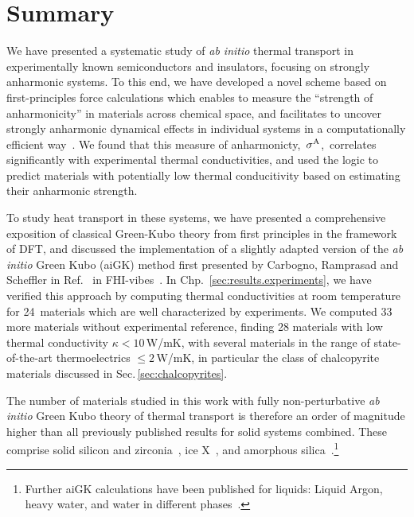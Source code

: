 \section*{Summary}

We have presented a systematic study of \emph{ab initio} thermal transport in experimentally known semiconductors and insulators, focusing on strongly anharmonic systems. To this end, we have developed a novel scheme based on first-principles force calculations which enables to measure the ``strength of anharmonicity'' in materials across chemical space, and facilitates to uncover strongly anharmonic dynamical effects in individual systems in a computationally efficient way~\cite{Knoop.2020}.
 We found that this measure of anharmonicty,~$\sigma^\mathrm{A}$,~correlates significantly with experimental thermal conductivities, and used the logic to predict materials with potentially low thermal conducitivity based on estimating their anharmonic strength.

To study heat transport in these systems, we have presented a comprehensive exposition of classical Green-Kubo theory from first principles in the framework of DFT, and discussed the implementation of a slightly adapted version of the \emph{ab initio} Green Kubo (aiGK) method first presented by Carbogno, Ramprasad and Scheffler in Ref.~\cite{Carbogno.2016} in FHI-vibes~\cite{FHI-vibes}. In Chp.~\ref{sec:results.experiments}, we have verified this approach by computing thermal conductivities at room temperature for 24~materials which are well characterized by experiments. 
We computed 33 more materials without experimental reference, finding 28 materials with low thermal conductivity $\kappa < 10$\,W/mK, with several materials in the range of state-of-the-art thermoelectrics $\leq 2$\,W/mK, in particular the class of chalcopyrite materials discussed in Sec.\,\ref{sec:chalcopyrites}.

The number of materials studied in this work with fully non-perturbative \emph{ab initio} Green Kubo theory of thermal transport is therefore an order of magnitude higher than all previously published results for solid systems combined. These comprise solid silicon and zirconia~\cite{Carbogno.2016}, ice X~\cite{Grasselli.2020}, and amorphous silica~\cite{Marcolongo.2020}.\footnote{Further aiGK calculations have been published for liquids: Liquid Argon, heavy water, and water in different phases~\cite{Marcolongo.2016,Marcolongo.2020,Grasselli.2020}.}

